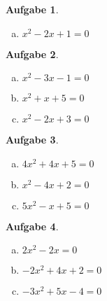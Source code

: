 \documentclass[12pt]{article}
\theoremstyle{note}
\newtheorem{aufgabe}{Aufgabe}
\begin{document}
\begin{flushleft}
\begin{aufgabe}
\begin{multicols}{3}
\begin{enumerate}[a)]
\item $x^{2} - 2 x + 1 = 0$\\
\end{enumerate} 
\end{multicols} 
\end{aufgabe}\vspace{1em}\begin{aufgabe} ~ \ 
\begin{multicols}{3} 
\begin{enumerate}[a)] 
\item $x^{2} - 3 x - 1 = 0$\\
\item $x^{2} + x + 5 = 0$\\
\item $x^{2} - 2 x + 3 = 0$\\
\end{enumerate} 
\end{multicols} 
\end{aufgabe}\vspace{1em}\begin{aufgabe} ~ \ 
\begin{multicols}{3} 
\begin{enumerate}[a)] 
\item $4 x^{2} + 4 x + 5 = 0$\\
\item $x^{2} - 4 x + 2 = 0$\\
\item $5 x^{2} - x + 5 = 0$\\
\end{enumerate} 
\end{multicols} 
\end{aufgabe}\vspace{1em}\begin{aufgabe} ~ \ 
\begin{multicols}{3} 
\begin{enumerate}[a)] 
\item $2 x^{2} - 2 x = 0$\\
\item $- 2 x^{2} + 4 x + 2 = 0$\\
\item $- 3 x^{2} + 5 x - 4 = 0$\\
\end{enumerate} 
\end{multicols} 
\end{aufgabe}\vspace{1em}
\end{flushleft} 
\end{document}
